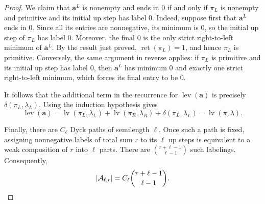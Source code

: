 \documentclass[10pt,a4paper]{amsart}
\DeclareMathOperator{\lev}{lev}
\DeclareMathOperator{\lv}{lv}
\DeclareMathOperator{\ret}{ret}
\begin{document}
\begin{proof}
We claim that $\mathbf{a}^{L}$ is nonempty and ends in $0$ if and only if
$\pi_L$ is nonempty and primitive and its initial up step has label $0$.
Indeed, suppose first that $\mathbf{a}^{L}$ ends in $0$. Since all its
entries are nonnegative, its minimum is $0$, so the initial up step of
$\pi_L$ has label $0$. Moreover, the final $0$ is the only strict
right-to-left minimum of $\mathbf{a}^{L}$. By the result just proved,
$\ret(\pi_L)=1$, and hence $\pi_L$ is primitive. Conversely, the same argument in reverse applies: if $\pi_L$ is primitive
and its initial up step has label $0$, then $\mathbf{a}^{L}$ has minimum
$0$ and exactly one strict right-to-left minimum, which forces its final
entry to be $0$.

It follows that the additional term in the recurrence for
$\lev(\mathbf{a})$ is precisely
$\delta(\pi_L,\lambda_L)$. Using the induction hypothesis gives
\[
\lev(\mathbf{a})
=
\lv(\pi_L,\lambda_L)
+
\lv(\pi_R,\lambda_R)
+
\delta(\pi_L,\lambda_L)
=
\lv(\pi,\lambda).
\]


Finally, there are $C_\ell$ Dyck paths of semilength $\ell$. Once such a
path is fixed, assigning nonnegative labels of total sum $r$ to its
$\ell$ up steps is equivalent to a weak composition of $r$ into $\ell$
parts. There are $\binom{r+\ell-1}{\ell-1}$ such labelings. Consequently,
\[
\lvert\mathcal{A}_{\ell,r}\rvert
=
C_\ell\binom{r+\ell-1}{\ell-1}. \qedhere
\]
\end{proof}
\end{document}
